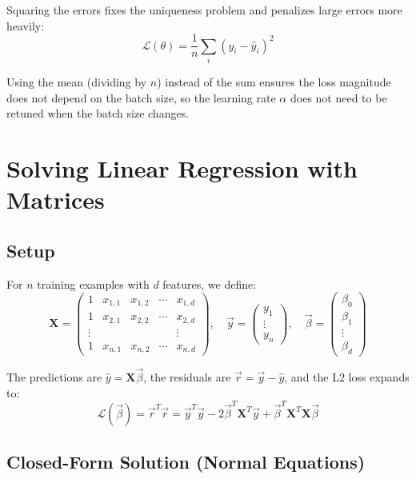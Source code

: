 \documentclass[12pt]{article}
\begin{document}
Squaring the errors fixes the uniqueness problem and penalizes large errors more heavily:
\[
\mathcal{L}(\theta) = \frac{1}{n}\sum_i (y_i - \hat{y}_i)^2
\]

Using the mean (dividing by $n$) instead of the sum ensures the loss magnitude does not depend on the batch size, so the learning rate $\alpha$ does not need to be retuned when the batch size changes.

\section{Solving Linear Regression with Matrices}

\subsection{Setup}

For $n$ training examples with $d$ features, we define:
\[
\boldsymbol{X} = \begin{pmatrix} 1 & x_{1,1} & x_{1,2} & \cdots & x_{1,d} \\ 1 & x_{2,1} & x_{2,2} & \cdots & x_{2,d} \\ \vdots & & & & \vdots \\ 1 & x_{n,1} & x_{n,2} & \cdots & x_{n,d} \end{pmatrix}, \quad
\vec{y} = \begin{pmatrix} y_1 \\ \vdots \\ y_n \end{pmatrix}, \quad
\vec{\beta} = \begin{pmatrix} \beta_0 \\ \beta_1 \\ \vdots \\ \beta_d \end{pmatrix}
\]

The predictions are $\hat{y} = \boldsymbol{X}\vec{\beta}$, the residuals are $\vec{r} = \vec{y} - \hat{y}$, and the L2 loss expands to:
\[
\mathcal{L}(\vec{\beta}) = \vec{r}^T\vec{r} = \vec{y}^T\vec{y} - 2\vec{\beta}^T\boldsymbol{X}^T\vec{y} + \vec{\beta}^T\boldsymbol{X}^T\boldsymbol{X}\vec{\beta}
\]

\subsection{Closed-Form Solution (Normal Equations)}
\end{document}
